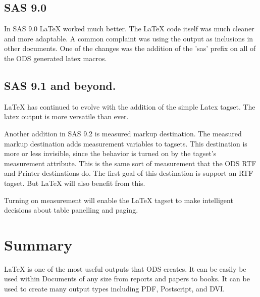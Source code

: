 \subsection{SAS 9.0}
In SAS 9.0 LaTeX worked much better.  The LaTeX code itself was much
cleaner and more adaptable.  A common complaint was using the output
as inclusions in other documents.  One of the changes was the addition
of the 'sas' prefix on all of the ODS generated latex macros.

\subsection{SAS 9.1 and beyond.}
LaTeX has continued to evolve with the addition of the simple Latex
tagset.  The latex output is more versatile than ever.

Another addition in SAS 9.2 is 
measured markup destination.  
The measured markup destination
adds measurement variables to tagsets.
This destination is more or less invisible, since the behavior is
turned on by the tagset's measurement attribute.
This is the same sort of measurement
that the ODS RTF and Printer destinations do.  The first goal of this
destination is support an RTF tagset.  But LaTeX will also benefit from
this.

Turning on measurement will enable the LaTeX tagset to make intelligent 
decisions about table panelling and paging. 

\section{Summary}
LaTeX is one of the most useful outputs that ODS creates.  It can be
easily be used within Documents of any size from reports and papers to
books.  It can be used to create many output types including PDF, Postscript,
and DVI.



